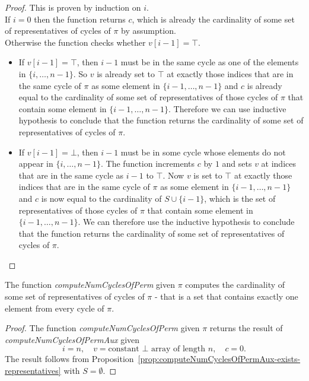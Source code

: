 \begin{proof}
  \leanok
  This is proven by induction on $i$.\\
  If $i = 0$ then the function returns $c$, which is already the cardinality of some set of representatives of cycles of $\pi$ by assumption.\\
  Otherwise the function checks whether $v[i - 1] = \top$.
  \begin{itemize}
    \item If $v[i - 1] = \top$, then $i - 1$ must be in the same cycle as one of the elements in $\{i, \dots, n - 1\}$. So $v$ is already set to $\top$ at exactly those indices that are in the same cycle of $\pi$ as some element in $\{i - 1, \dots, n - 1\}$ and $c$ is already equal to the cardinality of some set of representatives of those cycles of $\pi$ that contain some element in $\{i - 1, \dots, n - 1\}$. Therefore we can use inductive hypothesis to conclude that the function returns the cardinality of some set of representatives of cycles of $\pi$.
    \item If $v[i - 1] = \bot$, then $i - 1$ must be in some cycle whose elements do not appear in $\{i, \dots, n - 1\}$. The function increments $c$ by $1$ and sets $v$ at indices that are in the same cycle as $i - 1$ to $\top$. Now $v$ is set to $\top$ at exactly those indices that are in the same cycle of $\pi$ as some element in $\{i - 1, \dots, n - 1\}$ and $c$ is now equal to the cardinality of $S \cup \{i - 1\}$, which is the set of representatives of those cycles of $\pi$ that contain some element in $\{i - 1, \dots, n - 1\}$. We can therefore use the inductive hypothesis to conclude that the function returns the cardinality of some set of representatives of cycles of $\pi$.
  \end{itemize}
\end{proof}

\begin{proposition}
  \label{prop:computeNumCyclesOfPerm-exists-representatives}
  \leanok
  The function \emph{computeNumCyclesOfPerm} given $\pi$ computes the cardinality of some set of representatives of cycles of $\pi$ - that is a set that contains exactly one element from every cycle of $\pi$.
\end{proposition}

\begin{proof}
  \leanok
  The function \emph{computeNumCyclesOfPerm} given $\pi$ returns the result of \emph{computeNumCyclesOfPermAux} given
  \begin{equation*}
    i = n, \quad v = \text{constant } \bot \text{ array of length } n, \quad c = 0.
  \end{equation*}
  The result follows from Proposition~\ref{prop:computeNumCyclesOfPermAux-exists-representatives} with $S = \emptyset$.
\end{proof}

